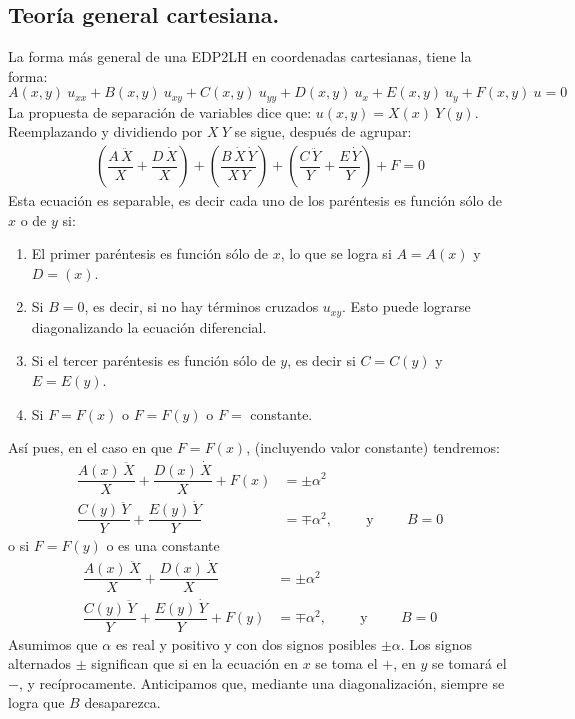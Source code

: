 \subsection{Teoría general cartesiana.}
La forma más general de una EDP2LH en coordenadas cartesianas, tiene la forma:
\[ A(x,y) \: u_{xx} + B(x,y) \: u_{xy} + C(x,y) \: u_{yy} + D(x,y) \: u_{x} + E(x,y) \: u_{y} + F(x,y) \:u = 0 \]
La propuesta de separación de variables dice que: $u(x, y) = X(x) \:Y (y)$. Reemplazando y dividiendo por $X \:Y$ se sigue, después de agrupar:
\begin{align*}
\left( \dfrac{A \, \ddot{X}}{X} + \dfrac{D \, \dot{X}}{X} \right) + \left( \dfrac{B \, \dot{X} \, \dot{Y}}{X \, Y} \right) + \left( \dfrac{C \, \ddot{Y}}{Y} + \dfrac{E \, \dot{Y}}{Y} \right) + F = 0
\end{align*}
Esta ecuación es separable, es decir cada uno de los paréntesis es función sólo de $x$ o de $y$ si:
\begin{enumerate}
\item  El primer paréntesis es función sólo de $x$, lo que se logra si $A = A(x)$ y $D = (x)$.
\item  Si $B = 0$, es decir, si no hay términos cruzados $u_{xy}$. Esto puede lograrse diagonalizando la ecuación diferencial.
\item Si el tercer paréntesis es función sólo de $y$, es decir si $C = C(y)$ y $E = E(y)$.
\item Si $F =F(x)$ o $F =F(y)$ o $F =$ constante.
\end{enumerate}
Así pues, en el caso en que $F = F (x)$, (incluyendo valor constante) tendremos:
\begin{align*}
\dfrac{A(x) \, \ddot{X}}{X} + \dfrac{D(x) \, \dot{X}}{X} + F(x) &= \pm \alpha^{2} \\[1em]
\dfrac{C(y) \, \ddot{Y}}{Y} + \dfrac{E(y) \, \dot{Y}}{Y} &= \mp \alpha^{2}, \hspace{1cm} \mbox{y} \hspace{1cm} B = 0
\end{align*}
o si $F = F(y)$ o es una constante
\begin{align*}
\dfrac{A(x) \, \ddot{X}}{X} + \dfrac{D(x) \, \dot{X}}{X} &= \pm \alpha^{2} \\[1em]
\dfrac{C(y) \, \ddot{Y}}{Y} + \dfrac{E(y) \, \dot{Y}}{Y}  + F(y) &= \mp \alpha^{2}, \hspace{1cm} \mbox{y} \hspace{1cm} B = 0
\end{align*}
Asumimos que $\alpha$ es real y positivo y con dos signos posibles $\pm \alpha$. Los signos alternados $\pm$ significan que si en la ecuación en $x$ se toma el $+$, en $y$ se tomará el $-$, y recíprocamente. Anticipamos que, mediante una diagonalización, siempre se logra que $B$ desaparezca.
